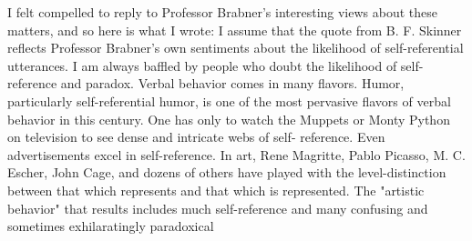 I felt compelled to reply to Professor Brabner's interesting views about these matters, and so here is what I wrote: 
I assume that the quote from B. F. Skinner reflects Professor Brabner's own sentiments about the likelihood of self-referential utterances. I am always baffled by people who doubt the likelihood of self-reference and paradox. Verbal behavior comes in many flavors. Humor, particularly self-referential humor, is one of the most pervasive flavors of verbal behavior in this century. One has only to watch the Muppets or Monty Python on television to see dense and intricate webs of self- reference. Even advertisements excel in self-reference. In art, Rene Magritte, Pablo Picasso, M. C. Escher, John Cage, and dozens of others have played with the level-distinction between that which represents and that which is represented. The "artistic behavior" that results includes much self-reference and many confusing and sometimes exhilaratingly paradoxical 


